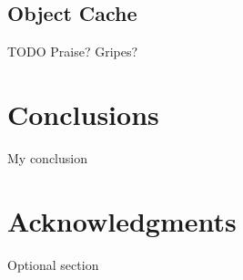 \documentclass{acm_proc_article-sp}
\begin{document}
\subsection{Object Cache}

TODO Praise? Gripes?

\section{Conclusions}
My conclusion

\section{Acknowledgments}
Optional section

%

%
%


\end{document}
